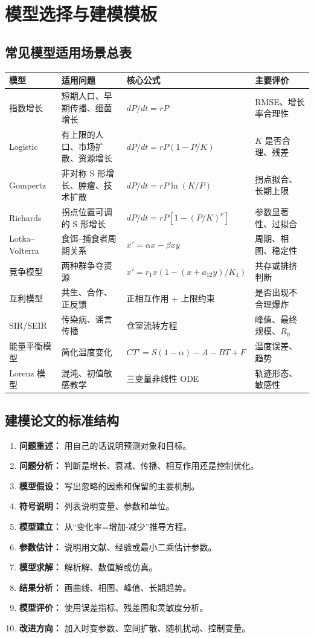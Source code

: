 \documentclass[11pt,a4paper]{ctexart}
\begin{document}
\section{模型选择与建模模板}

\subsection{常见模型适用场景总表}
\begin{longtable}{p{3.2cm}p{4.2cm}p{4.2cm}p{2.8cm}}
\toprule
模型 & 适用问题 & 核心公式 & 主要评价 \\
\midrule
指数增长 & 短期人口、早期传播、细菌增长 & $dP/dt=rP$ & RMSE、增长率合理性 \\
Logistic & 有上限的人口、市场扩散、资源增长 & $dP/dt=rP(1-P/K)$ & $K$ 是否合理、残差 \\
Gompertz & 非对称 S 形增长、肿瘤、技术扩散 & $dP/dt=rP\ln(K/P)$ & 拐点拟合、长期上限 \\
Richards & 拐点位置可调的 S 形增长 & $dP/dt=rP[1-(P/K)^\nu]$ & 参数显著性、过拟合 \\
Lotka--Volterra & 食饵--捕食者周期关系 & $x'=\alpha x-\beta xy$ & 周期、相图、稳定性 \\
竞争模型 & 两种群争夺资源 & $x'=r_1x(1-(x+a_{12}y)/K_1)$ & 共存或排挤判断 \\
互利模型 & 共生、合作、正反馈 & 正相互作用 + 上限约束 & 是否出现不合理爆炸 \\
SIR/SEIR & 传染病、谣言传播 & 仓室流转方程 & 峰值、最终规模、$R_0$ \\
能量平衡模型 & 简化温度变化 & $C T'=S(1-\alpha)-A-BT+F$ & 温度误差、趋势 \\
Lorenz 模型 & 混沌、初值敏感教学 & 三变量非线性 ODE & 轨迹形态、敏感性 \\
\bottomrule
\end{longtable}

\subsection{建模论文的标准结构}
\begin{enumerate}[itemsep=0.25em]
\item \textbf{问题重述：} 用自己的话说明预测对象和目标。
\item \textbf{问题分析：} 判断是增长、衰减、传播、相互作用还是控制优化。
\item \textbf{模型假设：} 写出忽略的因素和保留的主要机制。
\item \textbf{符号说明：} 列表说明变量、参数和单位。
\item \textbf{模型建立：} 从“变化率=增加-减少”推导方程。
\item \textbf{参数估计：} 说明用文献、经验或最小二乘估计参数。
\item \textbf{模型求解：} 解析解、数值解或仿真。
\item \textbf{结果分析：} 画曲线、相图、峰值、长期趋势。
\item \textbf{模型评价：} 使用误差指标、残差图和灵敏度分析。
\item \textbf{改进方向：} 加入时变参数、空间扩散、随机扰动、控制变量。
\end{enumerate}
\end{document}
